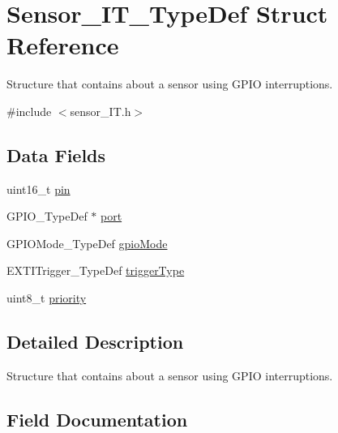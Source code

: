 \hypertarget{struct_sensor___i_t___type_def}{}\section{Sensor\+\_\+\+I\+T\+\_\+\+Type\+Def Struct Reference}
\label{struct_sensor___i_t___type_def}


Structure that contains about a sensor using G\+P\+IO interruptions.  




{\ttfamily \#include $<$sensor\+\_\+\+I\+T.\+h$>$}

\subsection*{Data Fields}
\begin{DoxyCompactItemize}
\item 
uint16\+\_\+t \hyperlink{struct_sensor___i_t___type_def_a4144813adfa4dfe7e7cbeea17d1b06eb}{pin}
\item 
G\+P\+I\+O\+\_\+\+Type\+Def $\ast$ \hyperlink{struct_sensor___i_t___type_def_a82241972e0292c7de95ea1e293e11be3}{port}
\item 
G\+P\+I\+O\+Mode\+\_\+\+Type\+Def \hyperlink{struct_sensor___i_t___type_def_afa8578d9bd7179c1b9c23da9f99734d3}{gpio\+Mode}
\item 
E\+X\+T\+I\+Trigger\+\_\+\+Type\+Def \hyperlink{struct_sensor___i_t___type_def_a6625b6963fd4f630224d40f04877bd21}{trigger\+Type}
\item 
uint8\+\_\+t \hyperlink{struct_sensor___i_t___type_def_a0ad043071ccc7a261d79a759dc9c6f0c}{priority}
\end{DoxyCompactItemize}


\subsection{Detailed Description}
Structure that contains about a sensor using G\+P\+IO interruptions. 

\subsection{Field Documentation}
\mbox{\label{struct_sensor___i_t___type_def_afa8578d9bd7179c1b9c23da9f99734d3}} 
